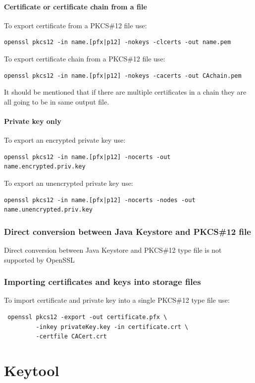 \documentclass[10pt, a4paper]{report}
\begin{document}
{    \subsubsection{Certificate or certificate chain from a file}
    To export certificate from a PKCS\#12 file use:
\begin{verbatim}
openssl pkcs12 -in name.[pfx|p12] -nokeys -clcerts -out name.pem
\end{verbatim}

    To export certificate chain from a PKCS\#12 file use:
\begin{verbatim}
openssl pkcs12 -in name.[pfx|p12] -nokeys -cacerts -out CAchain.pem
\end{verbatim}
    It should be mentioned that if there are multiple certificates in a chain they are all going to be in same output file.

    \subsubsection{Private key only}
    To export an encrypted private key use:
\begin{verbatim}
openssl pkcs12 -in name.[pfx|p12] -nocerts -out name.encrypted.priv.key
\end{verbatim}

    To export an unencrypted private key use:
\begin{verbatim}
openssl pkcs12 -in name.[pfx|p12] -nocerts -nodes -out name.unencrypted.priv.key
\end{verbatim}


  \subsection{Direct conversion between Java Keystore and PKCS\#12 file}
Direct conversion between Java Keystore and PKCS\#12 type file is not supported by OpenSSL 
  \subsection{Importing certificates and keys into storage files}
To import certificate and private key into a single PKCS\#12 type file use:
\begin{verbatim}
 openssl pkcs12 -export -out certificate.pfx \
         -inkey privateKey.key -in certificate.crt \
         -certfile CACert.crt
\end{verbatim}




\chapter{Keytool}

}
\end{document}
